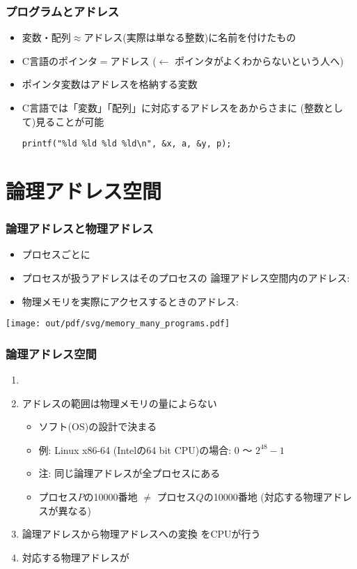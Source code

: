\documentclass[12pt,dvipdfmx]{beamer}
\begin{document}
\begin{frame}[fragile]
  \frametitle{プログラムとアドレス}
  \begin{itemize}
  \item 変数・配列$\approx$アドレス(実際は単なる整数)に名前を付けたもの
  \item C言語のポインタ$=$アドレス
    ($\leftarrow$ ポインタがよくわからないという人へ)
  \item ポインタ変数はアドレスを格納する変数
  \item C言語では「変数」「配列」に対応するアドレスをあからさまに
    (整数として)見ることが可能
\begin{lstlisting}
printf("%ld %ld %ld %ld\n", &x, a, &y, p);
\end{lstlisting}
    
  \end{itemize}
\end{frame}

\section{論理アドレス空間}

\begin{frame}
  \frametitle{論理アドレスと物理アドレス}
  \begin{itemize}
  \item プロセスごとに
  \item プロセスが扱うアドレスはそのプロセスの
    論理アドレス空間内のアドレス:
  \item 物理メモリを実際にアクセスするときのアドレス: 
  \end{itemize}
  \begin{center}
    \texttt{[image: out/pdf/svg/memory\_many\_programs.pdf]}
  \end{center}
\end{frame}

\begin{frame}
  \frametitle{論理アドレス空間}
  \begin{enumerate}
  \item {}
  \item アドレスの範囲は物理メモリの量によらない
    \begin{itemize}
    \item ソフト(OS)の設計で決まる
    \item 例: Linux x86-64 (Intelの64 bit CPU)の場合: 0 〜 $2^{48} - 1$
    \item 注: 同じ論理アドレスが全プロセスにある
    \item プロセス$P$の10000番地 $\neq$ プロセス$Q$の10000番地
      (対応する物理アドレスが異なる)
    \end{itemize}
  \item 論理アドレスから物理アドレスへの変換
    をCPUが行う
  \item 対応する物理アドレスが
  \end{enumerate}
\end{frame}
\end{document}
